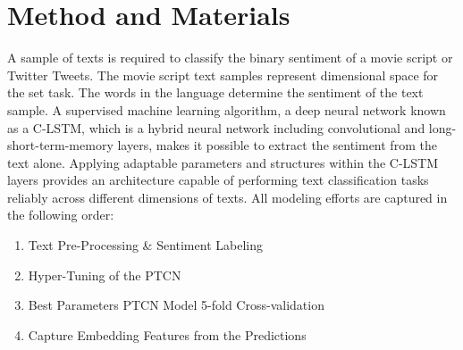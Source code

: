 \documentclass[conference,final,]{IEEEtran}
\providecommand{\tightlist}{%
  \setlength{\itemsep}{0pt}\setlength{\parskip}{0pt}}
\begin{document}




\maketitle


%
\IEEEpeerreviewmaketitle


\hypertarget{method-and-materials}{%
\section{Method and Materials}\label{method-and-materials}}

A sample of texts is required to classify the binary sentiment of a movie script or Twitter Tweets.
The movie script text samples represent dimensional space for the set task.
The words in the language determine the sentiment of the text sample.
A supervised machine learning algorithm, a deep neural network known as a C-LSTM, which is a hybrid neural network including convolutional and long-short-term-memory layers, makes it possible to extract the sentiment from the text alone.
Applying adaptable parameters and structures within the C-LSTM layers provides an architecture capable of performing text classification tasks reliably across different dimensions of texts.
All modeling efforts are captured in the following order:

\begin{enumerate}
\def\labelenumi{\arabic{enumi})}
\tightlist
\item
  Text Pre-Processing \& Sentiment Labeling
\item
  Hyper-Tuning of the PTCN
\item
  Best Parameters PTCN Model 5-fold Cross-validation
\item
  Capture Embedding Features from the Predictions
\end{enumerate}
\end{document}
